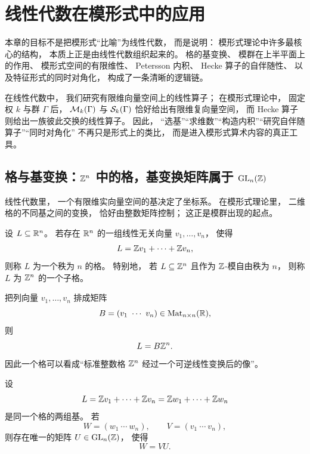 \chapter{线性代数在模形式中的应用}




\newcommand{\ctinf}{\mathrm{ct}_{\infty}}




本章的目标不是把模形式“比喻”为线性代数， 而是说明： 模形式理论中许多最核心的结构， 本质上正是由线性代数组织起来的。 格的基变换、 模群在上半平面上的作用、 模形式空间的有限维性、 Petersson 内积、 Hecke 算子的自伴随性、 以及特征形式的同时对角化， 构成了一条清晰的逻辑链。




在线性代数中， 我们研究有限维向量空间上的线性算子； 在模形式理论中， 固定权 $k$ 与群 $\Gamma$ 后， $\mathcal{M}_k(\Gamma)$ 与 $\mathcal{S}_k(\Gamma)$ 恰好给出有限维复向量空间， 而 Hecke 算子则给出一族彼此交换的线性算子。 因此， “选基”“求维数”“构造内积”“研究自伴随算子”“同时对角化” 不再只是形式上的类比， 而是进入模形式算术内容的真正工具。




\section{格与基变换：$\Z^n$ 中的格，基变换矩阵属于 $\mathrm{GL}_n(\mathbb{Z})$}




线性代数里， 一个有限维实向量空间的基决定了坐标系。 在模形式理论里， 二维格的不同基之间的变换， 恰好由整数矩阵控制； 这正是模群出现的起点。




\begin{definition}[$\Z^n$ 中的格] 设 $L\subseteq \mathbb{R}^n$。 若存在 $\mathbb{R}^n$ 的一组线性无关向量 $v_1,\dots,v_n$， 使得 \[ L=\mathbb{Z} v_1+\cdots+\mathbb{Z} v_n, \] 则称 $L$ 为一个秩为 $n$ 的格。 特别地， 若 $L\subseteq \mathbb{Z}^n$ 且作为 $\mathbb{Z}$-模自由秩为 $n$， 则称 $L$ 为 $\Z^n$ 的一个子格。 \end{definition} 把列向量 $v_1,\dots,v_n$ 排成矩阵 \[ B=(v_1\ \cdots\ v_n)\in \mathrm{Mat}_{n\times n}(\mathbb{R}), \] 则 \[ L=B\mathbb{Z}^n. \] 因此一个格可以看成“标准整数格 $\Z^n$ 经过一个可逆线性变换后的像”。




\begin{proposition}[同一格的两组基只差一个整可逆矩阵] 设 \[ L=\mathbb{Z} v_1+\cdots+\mathbb{Z} v_n=\mathbb{Z} w_1+\cdots+\mathbb{Z} w_n \] 是同一个格的两组基。 若 \[ W=(w_1\ \cdots\ w_n),\qquad V=(v_1\ \cdots\ v_n), \] 则存在唯一的矩阵 $U\in \mathrm{GL}_n(\mathbb{Z})$， 使得 \[ W=VU. \] \end{proposition}




